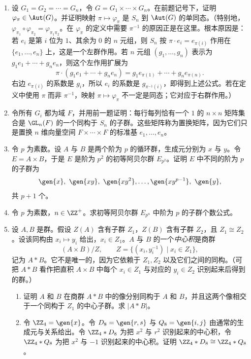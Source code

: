 \begin{enumerate}[label=\arabic*.]
  \item 设 $G_1=G_2=\cdots=G_n$，令 $G=G_1\times\cdots\times G_n$。在前题记号下，证明 $\varphi_\pi\in\Aut(G)$。并证明映射 $\pi\mapsto \varphi_\pi$ 是 $S_n$ 到 $\Aut(G)$ 的单同态。（特别地，$\varphi_{\pi_1}\circ\varphi_{\pi_2}=\varphi_{\pi_1\pi_2}$。在 $\varphi_\pi$ 的定义中需要 $\pi^{-1}$ 的原因正是在这里。根本原因是：若 $e_i$ 是第 $i$ 位为 $1$、其余为 $0$ 的 $n$ 元组，则 $S_n$ 按 $\pi\cdot e_i=e_{\pi(i)}$ 作用在 $\{e_1,
\ldots,e_n\}$ 上，这是一个左群作用。若 $n$ 元组 $(g_1,
\ldots,g_n)$ 表示为 $g_1e_1+\cdots+g_ne_n$，则这个左作用扩展为
  \[
    \pi\cdot(g_1e_1+
\cdots+g_ne_n)=g_1e_{\pi(1)}+\cdots+g_ne_{\pi(n)}.
  \]
  右边 $e_{\pi(i)}$ 的系数是 $g_i$，所以 $e_i$ 的系数是 $g_{\pi^{-1}(i)}$，即得到上述公式。若在定义中使用 $\pi$ 而非 $\pi^{-1}$，映射 $\pi\mapsto\varphi_\pi$ 不一定是同态；它对应于右群作用。）

  \item 令所有 $G_i$ 都为域 $F$，并用前一题证明：每行每列恰有一个 $1$ 的 $n\times n$ 矩阵集合是 $\GL_n(F)$ 的一个同构于 $S_n$ 的子群。这些矩阵称为置换矩阵，因为它们只是置换 $n$ 维向量空间 $F\times\cdots\times F$ 的标准基 $e_1,
\ldots,e_n$。

  \item 令 $p$ 为素数。设 $A$ 与 $B$ 是两个阶为 $p$ 的循环群，生成元分别为 $x$ 与 $y$。令 $E=A\times B$，于是 $E$ 是阶为 $p^2$ 的初等阿贝尔群 $E_{p^2}$。证明 $E$ 中不同的阶为 $p$ 的子群为
  \[
    \gen{x},\ \gen{xy},\ \gen{xy^2},\ldots,\gen{xy^{p-1}},\ \gen{y},
  \]
  共 $p+1$ 个。

  \item 令 $p$ 为素数，$n\in\ZZ^+$。求初等阿贝尔群 $E_{p^n}$ 中阶为 $p$ 的子群个数公式。

  \item 设 $A,B$ 是群。假设 $Z(A)$ 含有子群 $Z_1$，$Z(B)$ 含有子群 $Z_2$，且 $Z_1\cong Z_2$。设该同构由 $x_i\mapsto y_i$ 给出，$x_i\in Z_1$。$A$ 与 $B$ 的一个\emph{中心积}是商群
  \[
    (A\times B)/Z,
    \qquad Z=\{(x_i,y_i^{-1})\mid x_i\in Z_1\},
  \]
  记为 $A*B$。它不是唯一的，因为它依赖于 $Z_1,Z_2$ 以及它们之间的同构。（可把 $A*B$ 看作把直积 $A\times B$ 中每个 $x_i\in Z_1$ 与对应的 $y_i\in Z_2$ 识别起来后得到的群。）
  \begin{enumerate}[label=(\alph*)]
    \item 证明 $A$ 和 $B$ 在商群 $A*B$ 中的像分别同构于 $A$ 和 $B$，并且这两个像相交于一个同构于 $Z_1$ 的中心子群。求 $|A*B|$。
    \item 令 $\ZZ_4=\gen{x}$。令 $D_8=\gen{r,s}$ 与 $Q_8=\gen{i,j}$ 由通常的生成元与关系给出。令 $\ZZ_4*D_8$ 为把 $x^2$ 与 $r^2$ 识别起来的中心积，令 $\ZZ_4*Q_8$ 为把 $x^2$ 与 $-1$ 识别起来的中心积。证明 $\ZZ_4*D_8\cong \ZZ_4*Q_8$。
  \end{enumerate}


\end{enumerate}
